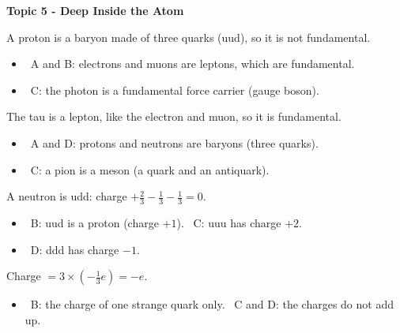 \documentclass[12pt]{article}
\newcommand\anstopic[1]{\par\Needspace{8\baselineskip}\vspace{4mm}%
  \begin{center}{\headfont\bfseries\fontsize{14}{18}\selectfont #1\par}\end{center}\vspace{2pt}}
\begin{document}
\begin{practiceanswers}
\anstopic{Topic 5 - Deep Inside the Atom}

\begin{practiceans}
  A proton is a baryon made of three quarks (uud), so it is not fundamental.
  \begin{itemize}
    \item \xmark\ A and B: electrons and muons are leptons, which are fundamental.
    \item \xmark\ C: the photon is a fundamental force carrier (gauge boson).
  \end{itemize}
\end{practiceans}

\begin{practiceans}
  The tau is a lepton, like the electron and muon, so it is fundamental.
  \begin{itemize}
    \item \xmark\ A and D: protons and neutrons are baryons (three quarks).
    \item \xmark\ C: a pion is a meson (a quark and an antiquark).
  \end{itemize}
\end{practiceans}

\begin{practiceans}
  A neutron is udd: charge $+\frac{2}{3} - \frac{1}{3} - \frac{1}{3} = 0$.
  \begin{itemize}
    \item \xmark\ B: uud is a proton (charge $+1$). \quad \xmark\ C: uuu has charge $+2$.
    \item \xmark\ D: ddd has charge $-1$.
  \end{itemize}
\end{practiceans}

\begin{practiceans}
  Charge $= 3 \times \left(-\frac{1}{3}e\right) = -e$.
  \begin{itemize}
    \item \xmark\ B: the charge of one strange quark only. \quad \xmark\ C and D: the charges do not add up.
  \end{itemize}
\end{practiceans}


\end{practiceanswers}
\end{document}

